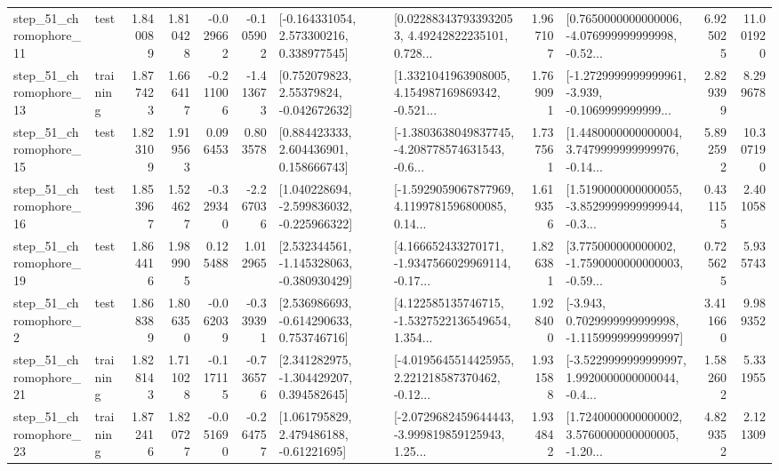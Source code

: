 \begin{tabular}{llrrrrllrlrr}
   step\_51\_chromophore\_11 &      test &      1.840089 &    1.810428 &     -0.029662 & -0.105902 &    [-0.164331054, 2.573300216, 0.338977545] &  [0.022883437933932053, 4.49242822235101, 0.728... &       1.967107 &  [0.7650000000000006, -4.076999999999998, -0.52... &            6.925025 &         11.001920 \\
   step\_51\_chromophore\_13 &  training &      1.877423 &    1.666417 &     -0.211006 & -1.413673 &     [0.752079823, 2.55379824, -0.042672632] &  [1.3321041963908005, 4.154987169869342, -0.521... &       1.769091 &  [-1.2729999999999961, -3.939, -0.1069999999999... &            2.829399 &          8.299678 \\
   step\_51\_chromophore\_15 &      test &      1.823109 &    1.919563 &      0.096453 &  0.803578 &     [0.884423333, 2.604436901, 0.158666743] &  [-1.3803638049837745, -4.208778574631543, -0.6... &       1.737561 &  [1.4480000000000004, 3.7479999999999976, -0.14... &            5.892592 &         10.307190 \\
   step\_51\_chromophore\_16 &      test &      1.853967 &    1.524627 &     -0.329340 & -2.267036 &   [1.040228694, -2.599836032, -0.225966322] &  [-1.5929059067877969, 4.1199781596800085, 0.14... &       1.619356 &  [1.5190000000000055, -3.8529999999999944, -0.3... &            0.431155 &          2.401058 \\
   step\_51\_chromophore\_19 &      test &      1.864416 &    1.989905 &      0.125488 &  1.012965 &   [2.532344561, -1.145328063, -0.380930429] &  [4.166652433270171, -1.9347566029969114, -0.17... &       1.826381 &  [3.775000000000002, -1.7590000000000003, -0.59... &            0.725625 &          5.935743 \\
    step\_51\_chromophore\_2 &      test &      1.868389 &    1.806350 &     -0.062039 & -0.339391 &    [2.536986693, -0.614290633, 0.753746716] &  [4.122585135746715, -1.5327522136549654, 1.354... &       1.928400 &  [-3.943, 0.7029999999999998, -1.1159999999999997] &            3.411660 &          9.989352 \\
   step\_51\_chromophore\_21 &  training &      1.828143 &    1.711028 &     -0.117115 & -0.736576 &    [2.341282975, -1.304429207, 0.394582645] &  [-4.0195645514425955, 2.221218587370462, -0.12... &       1.931588 &  [-3.5229999999999997, 1.9920000000000044, -0.4... &            1.582602 &          5.331955 \\
   step\_51\_chromophore\_23 &  training &      1.872416 &    1.820727 &     -0.051690 & -0.264757 &     [1.061795829, 2.479486188, -0.61221695] &  [-2.0729682459644443, -3.999819859125943, 1.25... &       1.934842 &  [1.7240000000000002, 3.5760000000000005, -1.20... &            4.829352 &          2.121309 \\

\end{tabular}
